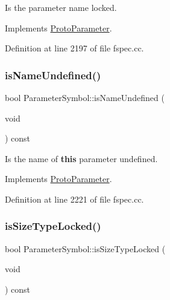 Is the parameter name locked. 



Implements \mbox{\hyperlink{class_proto_parameter_ae8d61607d66c96ac0fc9e0e6b7a100f1}{Proto\+Parameter}}.



Definition at line 2197 of file fspec.\+cc.

\mbox{\label{class_parameter_symbol_a6a2fd9c22592c3e7144b3eb3ff349fe6}} 
\subsubsection{\texorpdfstring{isNameUndefined()}{isNameUndefined()}}
{\footnotesize\ttfamily bool Parameter\+Symbol\+::is\+Name\+Undefined (\begin{DoxyParamCaption}\item[{void}]{ }\end{DoxyParamCaption}) const\hspace{0.3cm}{\ttfamily [virtual]}}



Is the name of {\bfseries{this}} parameter undefined. 



Implements \mbox{\hyperlink{class_proto_parameter_a62d78489a16faff7cff6db6a1cf2593f}{Proto\+Parameter}}.



Definition at line 2221 of file fspec.\+cc.

\mbox{\label{class_parameter_symbol_ab248a298389e7b04175de72a49275d31}} 
\subsubsection{\texorpdfstring{isSizeTypeLocked()}{isSizeTypeLocked()}}
{\footnotesize\ttfamily bool Parameter\+Symbol\+::is\+Size\+Type\+Locked (\begin{DoxyParamCaption}\item[{void}]{ }\end{DoxyParamCaption}) const\hspace{0.3cm}{\ttfamily [virtual]}}



